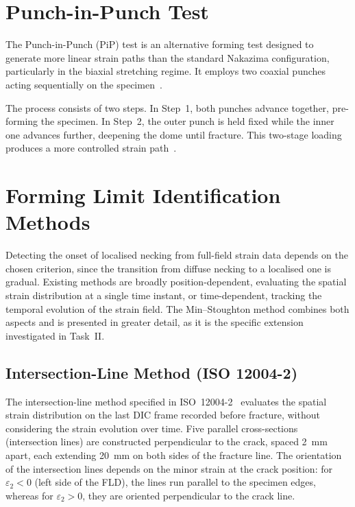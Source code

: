 \section{Punch-in-Punch Test}

The Punch-in-Punch (PiP) test is an alternative forming test designed to generate more linear strain paths than the standard Nakazima configuration, particularly in the biaxial stretching regime. It employs two coaxial punches acting sequentially on the specimen~\cite{Sen2025}.

The process consists of two steps. In Step~1, both punches advance together, pre-forming the specimen. In Step~2, the outer punch is held fixed while the inner one advances further, deepening the dome until fracture. This two-stage loading produces a more controlled strain path~\cite{Sen2025}.

\section{Forming Limit Identification Methods}

Detecting the onset of localised necking from full-field strain data depends on
the chosen criterion, since the transition from diffuse necking to a
localised one is gradual. Existing methods are broadly position-dependent,
evaluating the spatial strain distribution at a single time instant, or
time-dependent, tracking the temporal evolution of the strain field. The
Min--Stoughton method combines both aspects and is presented in greater
detail, as it is the specific extension investigated in Task~II.

\subsection{Intersection-Line Method (ISO 12004-2)}
\label{sec:din_method}

The intersection-line method specified in ISO~12004-2~\cite{ISO120042}
evaluates the spatial strain distribution on the last DIC frame recorded
before fracture, without considering the strain evolution over time. Five
parallel cross-sections
(intersection lines) are constructed perpendicular to the crack, spaced
\SI{2}{\milli\meter} apart, each extending \SI{20}{\milli\meter} on both sides
of the fracture line. The orientation of the intersection lines depends on the
minor strain at the crack position: for $\varepsilon_2 < 0$ (left side of the
FLD), the lines run parallel to the specimen edges, whereas for
$\varepsilon_2 > 0$, they are oriented perpendicular to the crack line.

